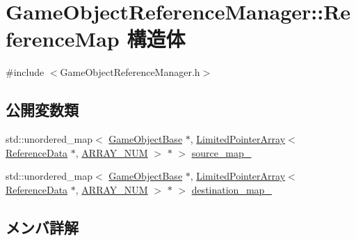 \hypertarget{struct_game_object_reference_manager_1_1_reference_map}{}\section{Game\+Object\+Reference\+Manager\+:\+:Reference\+Map 構造体}
\label{struct_game_object_reference_manager_1_1_reference_map}


{\ttfamily \#include $<$Game\+Object\+Reference\+Manager.\+h$>$}

\subsection*{公開変数類}
\begin{DoxyCompactItemize}
\item 
std\+::unordered\+\_\+map$<$ \mbox{\hyperlink{class_game_object_base}{Game\+Object\+Base}} $\ast$, \mbox{\hyperlink{class_limited_pointer_array}{Limited\+Pointer\+Array}}$<$ \mbox{\hyperlink{struct_game_object_reference_manager_1_1_reference_data}{Reference\+Data}} $\ast$, \mbox{\hyperlink{class_game_object_reference_manager_a962d30b10c5b76353645773b2c1740ce}{A\+R\+R\+A\+Y\+\_\+\+N\+UM}} $>$ $\ast$ $>$ \mbox{\hyperlink{struct_game_object_reference_manager_1_1_reference_map_a971b47dd8f37ba3739ce65a6dfe097ff}{source\+\_\+map\+\_\+}}
\item 
std\+::unordered\+\_\+map$<$ \mbox{\hyperlink{class_game_object_base}{Game\+Object\+Base}} $\ast$, \mbox{\hyperlink{class_limited_pointer_array}{Limited\+Pointer\+Array}}$<$ \mbox{\hyperlink{struct_game_object_reference_manager_1_1_reference_data}{Reference\+Data}} $\ast$, \mbox{\hyperlink{class_game_object_reference_manager_a962d30b10c5b76353645773b2c1740ce}{A\+R\+R\+A\+Y\+\_\+\+N\+UM}} $>$ $\ast$ $>$ \mbox{\hyperlink{struct_game_object_reference_manager_1_1_reference_map_adbf8d8d6d3ed18dcceb2ae04b8794351}{destination\+\_\+map\+\_\+}}
\end{DoxyCompactItemize}


\subsection{メンバ詳解}
\mbox{\label{struct_game_object_reference_manager_1_1_reference_map_adbf8d8d6d3ed18dcceb2ae04b8794351}} 
